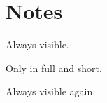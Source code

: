 \hypertarget{notes}{%
\section{Notes}\label{notes}}

Always visible.

Only in full and short.

Always visible again.
